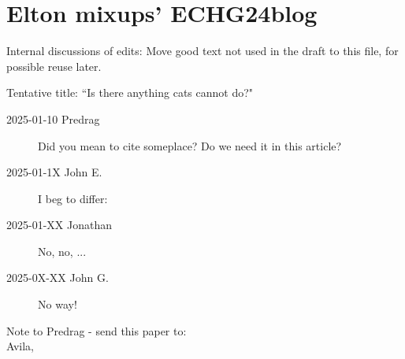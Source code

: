 
\section{Elton mixups' ECHG24blog}
\label{s:ECHG24blog}

Internal discussions of \citet{ECHG24} edits:
Move good text not used in the draft to this file, for possible
reuse later.

\bigskip

Tentative title:    ``Is there anything cats cannot do?"

\begin{description}

\item[2025-01-10 Predrag~~]
Did you mean to cite \citet{HKTH16} someplace? Do we need it in this article?

\item[2025-01-1X John E.~~]
I beg to differ:

\item[2025-01-XX Jonathan~~]
No, no, ...

\item[2025-0X-XX John G.~~]
No way!


\end{description}



%    
\bigskip\bigskip

\noindent
Note to Predrag - send this paper to:
\\

Avila,



